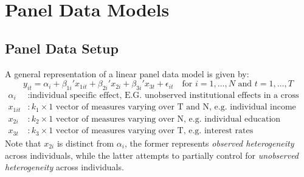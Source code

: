 \documentclass[DIV=14,titlepage=false]{scrreprt}
\begin{document}
\vspace{-10pt}
\setcounter{chapter}{4}


\chapter{Panel Data Models}
\section{Panel Data Setup}
A general representation of a linear panel data model is given by:
\[
    y_{it} = \alpha_i + \beta_{1i}'x_{1it} + \beta_{2i}'x_{2i} + \beta_{3i}'x_{3t} +\epsilon_{it} \quad \text{for } i = 1, \ldots, N \text{ and } t = 1, \ldots, T
\]
\begin{align*}
    \alpha_i &: \text{individual specific effect, E.G. unobserved institutional effects in a cross country growth model}\\
    x_{1it} &: k_1 \times 1 \text{ vector of measures varying over T and N, e.g. individual income}\\
    x_{2i} &: k_2 \times 1 \text{ vector of measures varying over N, e.g. individual education}\\
    x_{3t} &: k_3 \times 1 \text{ vector of measures varying over T, e.g. interest rates}
\end{align*}
Note that $x_{2i}$ is distinct from $\alpha_i$, the former represents \textit{observed heterogeneity} across individuals, while the latter attempts to partially control for \textit{unobserved heterogeneity} across individuals.\\
\end{document}
